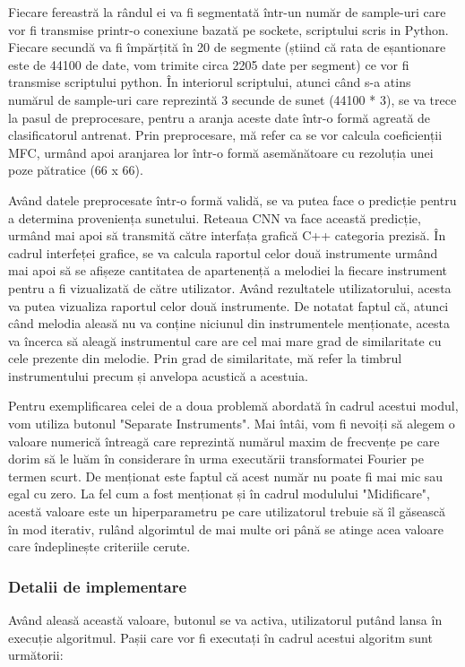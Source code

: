 \documentclass[a4paper,12pt]{report}
\begin{document}
	Fiecare fereastră la rândul ei va fi segmentată într-un număr de sample-uri care vor fi transmise printr-o conexiune bazată pe sockete, scriptului scris in Python. Fiecare secundă va fi împărțită în 20 de segmente (știind că rata de eșantionare este de 44100 de date, vom trimite circa 2205 date per segment) ce vor fi transmise scriptului python. În interiorul scriptului, atunci când s-a atins numărul de sample-uri care reprezintă 3 secunde de sunet (44100 * 3), se va trece la pasul de preprocesare, pentru a aranja aceste date într-o formă agreată de clasificatorul antrenat. Prin preprocesare, mă refer ca se vor calcula coeficienții MFC, urmând apoi aranjarea lor într-o formă asemănătoare cu rezoluția unei poze pătratice (66 x 66). 
	
	Având datele preprocesate într-o formă validă, se va putea face o predicție pentru a determina proveniența sunetului. Reteaua CNN va face această predicție, urmând mai apoi să transmită către interfața grafică C++ categoria prezisă. În cadrul interfeței grafice, se va calcula raportul celor două instrumente urmând mai apoi să se afișeze cantitatea de apartenență a melodiei la fiecare instrument pentru a fi vizualizată de către utilizator. Având rezultatele utilizatorului, acesta va putea vizualiza raportul celor două instrumente. De notatat faptul că, atunci când melodia aleasă nu va conține niciunul din instrumentele menționate, acesta va încerca să aleagă instrumentul care are cel mai mare grad de similaritate cu cele prezente din melodie. Prin grad de similaritate, mă refer la timbrul instrumentului precum și anvelopa acustică a acestuia. 
	
	Pentru exemplificarea celei de a doua problemă abordată în cadrul acestui modul, vom utiliza butonul "Separate Instruments". Mai întâi, vom fi nevoiți să alegem o valoare numerică întreagă care reprezintă numărul maxim de frecvențe pe care dorim să le luăm în considerare în urma executării transformatei Fourier pe termen scurt. De menționat este faptul că acest număr nu poate fi mai mic sau egal cu zero. La fel cum a fost menționat și în cadrul modulului "Midificare", acestă valoare este un hiperparametru pe care utilizatorul trebuie să îl găsească în mod iterativ, rulând algorimtul de mai multe ori până se atinge acea valoare care îndeplinește criteriile cerute. 
		
	\subsubsection{Detalii de implementare}
	Având aleasă această valoare, butonul se va activa, utilizatorul putând lansa în execuție algoritmul. Pașii care vor fi executați în cadrul acestui algoritm sunt următorii:
	
\end{document}

